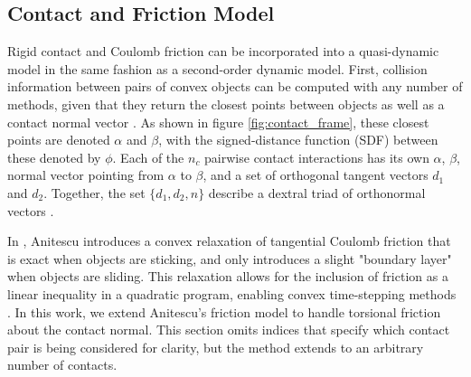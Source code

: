 \subsection{Contact and Friction Model}
Rigid contact and Coulomb friction can be incorporated into a quasi-dynamic model in the same fashion as a second-order dynamic model. First, collision information between pairs of convex objects can be computed with any number of methods, given that they return the closest points between objects as well as a contact normal vector \cite{gilbert1988,snethen2008,pan2012,tracy2022b}.
As shown in figure \ref{fig:contact_frame}, these closest points are denoted $\alpha$ and $\beta$, with the signed-distance function (SDF) between these denoted by $\phi$. Each of the $n_c$ pairwise contact interactions has its own $\alpha$, $\beta$, normal vector pointing from $\alpha$ to $\beta$, and a set of orthogonal tangent vectors $d_1$ and $d_2$. Together, the set $\{d_1, d_2, n\}$ describe a dextral triad of orthonormal vectors \cite{mitiguy2018, kane1983}. 

In \cite{anitescu2006}, Anitescu introduces a convex relaxation of tangential Coulomb friction that is exact when objects are sticking, and only introduces a slight "boundary layer" when objects are sliding. This relaxation allows for the inclusion of friction as a linear inequality in a quadratic program, enabling convex time-stepping methods \cite{pang2021}. In this work, we extend Anitescu's friction model to handle torsional friction about the contact normal.   This section omits indices that specify which contact pair is being considered for clarity, but the method extends to an arbitrary number of contacts.  

